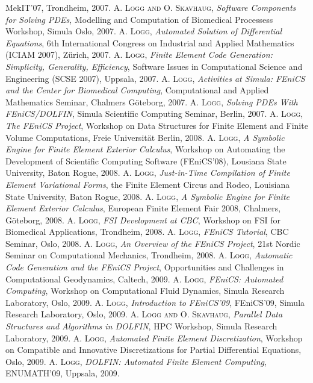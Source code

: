 \begin{thebibliography}{99}
{MekIT'07, Trondheim,
2007.
}
 {\textsc{A. Logg and O. Skavhaug},
\textit{Software Components for Solving {PDE}s},
Modelling and Computation of Biomedical Processess Workshop, Simula Oslo,
2007.
}
 {\textsc{A. Logg},
\textit{Automated Solution of Differential Equations},
6th International Congress on Industrial and Applied Mathematics (ICIAM 2007), Z\"urich,
2007.
}
 {\textsc{A. Logg},
\textit{Finite Element Code Generation: Simplicity, Generality, Efficiency},
Software Issues in Computational Science and Engineering (SCSE 2007), Uppsala,
2007.
}
 {\textsc{A. Logg},
\textit{Activities at Simula: {FE}ni{CS} and the Center for Biomedical Computing},
Computational and Applied Mathematics Seminar, Chalmers G{\"o}teborg,
2007.
}
 {\textsc{A. Logg},
\textit{Solving {PDE}s With {FE}ni{CS}/{DOLFIN}},
Simula Scientific Computing Seminar, Berlin,
2007.
}
 {\textsc{A. Logg},
\textit{The FEniCS Project},
Workshop on Data Structures for Finite Element and Finite Volume Computations, Freie Universit\"at Berlin,
2008.
}
 {\textsc{A. Logg},
\textit{A Symbolic Engine for Finite Element Exterior Calculus},
Workshop on Automating the Development of Scientific Computing Software (FEniCS'08), Lousiana State University, Baton Rogue,
2008.
}
 {\textsc{A. Logg},
\textit{Just-in-Time Compilation of Finite Element Variational Forms},
the Finite Element Circus and Rodeo, Louisiana State University, Baton Rogue,
2008.
}
 {\textsc{A. Logg},
\textit{A Symbolic Engine for Finite Element Exterior Calculus},
European Finite Element Fair 2008, Chalmers, G{\"o}teborg,
2008.
}
 {\textsc{A. Logg},
\textit{FSI Development at CBC},
Workshop on FSI for Biomedical Applications, Trondheim,
2008.
}
 {\textsc{A. Logg},
\textit{FEniCS Tutorial},
CBC Seminar, Oslo,
2008.
}
 {\textsc{A. Logg},
\textit{An Overview of the FEniCS Project},
21st Nordic Seminar on Computational Mechanics, Trondheim,
2008.
}
 {\textsc{A. Logg},
\textit{Automatic Code Generation and the FEniCS Project},
Opportunities and Challenges in Computational Geodynamics, Caltech,
2009.
}
 {\textsc{A. Logg},
\textit{FEniCS: Automated Computing},
Workshop on Computational Fluid Dynamics, Simula Research Laboratory, Oslo,
2009.
}
 {\textsc{A. Logg},
\textit{Introduction to FEniCS'09},
FEniCS'09, Simula Research Laboratory, Oslo,
2009.
}
 {\textsc{A. Logg and O. Skavhaug},
\textit{Parallel Data Structures and Algorithms in DOLFIN},
HPC Workshop, Simula Research Laboratory,
2009.
}
 {\textsc{A. Logg},
\textit{Automated Finite Element Discretization},
Workshop on Compatible and Innovative Discretizations for Partial Differential Equations, Oslo,
2009.
}
 {\textsc{A. Logg},
\textit{DOLFIN: Automated Finite Element Computing},
ENUMATH'09, Uppsala,
2009.
}

\end{thebibliography}
